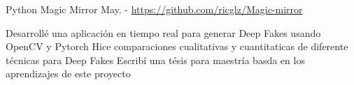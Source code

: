 \begin{cventries}

  \cventry
    {Python}
    {Magic Mirror} %
    {May. - } %
    {\url{https://github.com/ricglz/Magic-mirror}} %
    {
      \begin{cvitems} %
         {{
          Desarrollé una aplicación en tiempo real para generar Deep Fakes usando OpenCV y Pytorch
        }}
         {{
          Hice comparaciones cualitativas y cuantitaticas de diferente técnicas para Deep Fakes
        }}
         {{
          Escribí una tésis para maestría basda en los aprendizajes de este proyecto
        }}
      \end{cvitems}
    }


\end{cventries}
